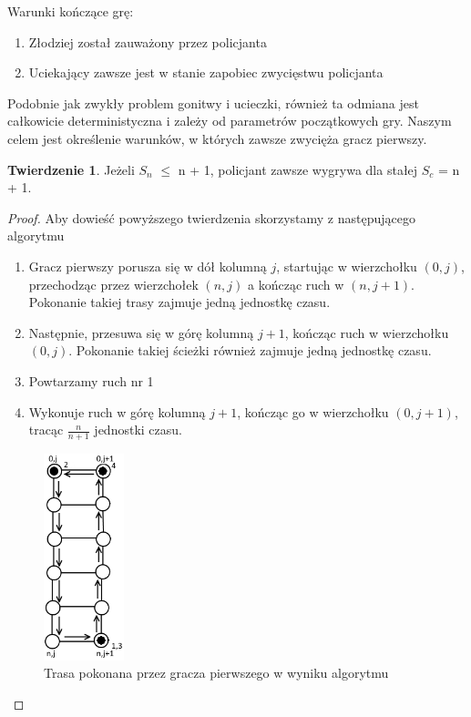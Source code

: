 \documentclass[brudnopis]{xmgr}
\theoremstyle{definition}
\newtheorem{Twierdzenie}{Twierdzenie}
\begin{document}
Warunki kończące grę:
\begin{enumerate}
  \item Złodziej został zauważony przez policjanta
  \item Uciekający zawsze jest w stanie zapobiec zwycięstwu policjanta
\end{enumerate}

Podobnie jak zwykły problem gonitwy i ucieczki, również ta odmiana jest całkowicie deterministyczna i zależy od parametrów początkowych gry. Naszym celem jest określenie warunków, w których zawsze zwycięża gracz pierwszy. 

\begin{Twierdzenie} \cite{poscig}
	Jeżeli $S_n$ $\le$ n + 1, policjant zawsze wygrywa dla stałej $S_c$ = n + 1.
\end{Twierdzenie}
\begin{proof}
	Aby dowieść powyższego twierdzenia skorzystamy z następującego algorytmu
	\begin{enumerate}
		\item Gracz pierwszy porusza się w dół kolumną $j$, startując w wierzchołku $(0,j)$, przechodząc przez wierzchołek $(n, j)$ a kończąc ruch w $(n, j + 1)$. Pokonanie takiej trasy zajmuje jedną jednostkę czasu.
		\item Następnie, przesuwa się w górę kolumną $j + 1$, kończąc ruch w wierzchołku $(0,j)$. Pokonanie takiej ścieżki również zajmuje jedną jednostkę czasu.
		\item Powtarzamy ruch nr 1
		\item Wykonuje ruch w górę kolumną $j + 1$, kończąc go w wierzchołku $(0,j + 1)$, tracąc $\frac{n}{n+1}$ jednostki czasu.
	\end{enumerate}
	\begin{figure}[ht!]
	  \centering
	  \includegraphics[height=6cm]{rysunki/schemat_ruchu.png}
	  \caption{Trasa pokonana przez gracza pierwszego w wyniku algorytmu}
	\end{figure} 


\end{proof}
\end{document}
